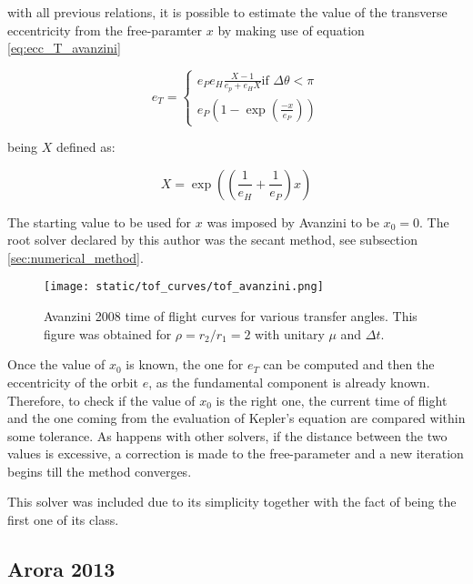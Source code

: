 with all previous relations, it is possible to estimate the value of the
transverse eccentricity from the free-paramter $x$ by making use of equation
\ref{eq:ecc_T_avanzini}

\begin{equation}
  e_T =
  \begin{cases}
    e_P e_H \frac{X - 1}{e_p + e_H X} \text{if $\Delta \theta < \pi$} \\
    e_P \left(1 - \exp{\left(\frac{-x}{e_P} \right)} \right)
  \end{cases}
  \label{eq:ecc_T_avanzini}
\end{equation}

being $X$ defined as:

\begin{equation}
  X = \exp{\left(\left(\frac{1}{e_H} + \frac{1}{e_P} \right)x\right)}
\end{equation}

The starting value to be used for $x$ was imposed by Avanzini to be $x_0 = 0$.
The root solver declared by this author was the secant method, see subsection
\ref{sec:numerical_method}.

\vspace{0.5cm}
\begin{figure}[h]
  \centering
  \texttt{[image: static/tof\_curves/tof\_avanzini.png]}
  \caption{Avanzini 2008 time of flight curves for various transfer angles. This
    figure was obtained for $\rho=r_2/r_1=2$ with unitary $\mu$ and $\Delta t$.}
  \label{fig:tof_avanzini}
\end{figure}

Once the value of $x_0$ is known, the one for $e_T$ can be computed and then
the eccentricity of the orbit $e$, as the fundamental component is already
known. Therefore, to check if the value of $x_0$ is the right one, the current
time of flight and the one coming from the evaluation of Kepler's equation are
compared within some tolerance. As happens with other solvers, if the distance
between the two values is excessive, a correction is made to the free-parameter
and a new iteration begins till the method converges.

This solver was included due to its simplicity together with the fact of being
the first one of its class.

\subsection{Arora 2013}

